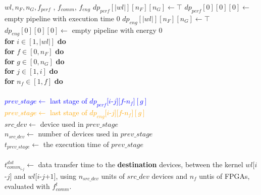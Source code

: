 \begin{algorithm}
\begin{algorithmic}[1]
\footnotesize
\Require $wl,  n_{F}, n_{G}, f_{perf}$ , $f_{comm}$, $f_{eng}$
\State $dp_{perf}[|wl|][n_{F}][n_{G}] \leftarrow {\top}$ 
\State $dp_{perf}[0][0][0] \leftarrow$ empty pipeline with execution time 0
\State $dp_{eng}[|wl|][n_{F}][n_{G}] \leftarrow \top$ 
\State $dp_{eng}[0][0][0] \leftarrow$ empty pipeline with energy 0\\
\textbf{for} {$i \in [1, |wl|]$} \textbf{do} \\
\textbf{for} {$f \in [0, n_{F}]$} \textbf{do} \\
\textbf{for} {$g \in [0, n_{G}]$} \textbf{do} \\
           \textbf{for} {$j \in [1,i]$} \textbf{do} \\
                 \hspace{1.3em} \textbf{for} {$n_f\in [1, f]$} \textbf{do} \\
                    \hspace{0.7em}   \\ 
                     \textcolor{blue}{ \hspace{2.6em} $prev\_stage \leftarrow$ last stage of $dp_{perf}[i$-$j][f$-$n_f][g]$} \\
                    \textcolor{orange}{ \hspace{2.6em} $prev\_stage \leftarrow$ last stage of $dp_{eng}[i$-$j][f$-$n_f][g]$} \\
                    \hspace{2.6em} $src\_dev \leftarrow$ device used in $prev\_stage$ \\
                    \hspace{2.6em} $n_{src\_dev} \leftarrow$ number of devices used in $prev\_stage$ \\
                    \hspace{2.6em} $t_{prev\_stage} \leftarrow$ the execution time of $prev\_stage$ \\
                     \\
                    \hspace{2.6em} $t^{dst}_{comm_{i\text{-}j}}\leftarrow$ data transfer time to the \textbf{destination} devices, between the kernel $wl[i$-$j]$ and $wl[i$-$j$+$1]$, using $n_{src\_dev}$ units of $src\_dev$ devices and $n_f$ untis of FPGAs, evaluated with $f^t_{comm}$. \\
                    \hspace{2.6em} \\

\end{algorithmic}
\end{algorithm}
